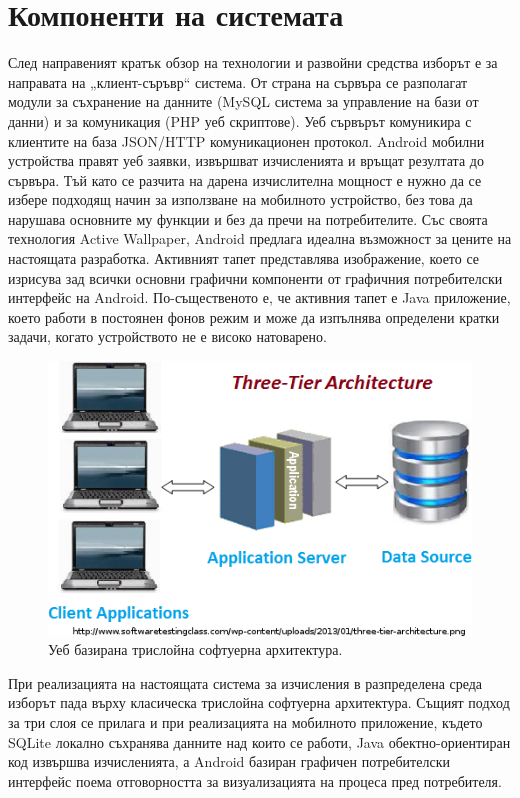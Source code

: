 \documentclass[book,14pt,oneside,openany]{memoir}
\begin{document}
\section{Компоненти на системата}

След направеният кратък обзор на технологии и развойни средства изборът е за направата на „клиент-съръвр“ система. От страна на сървъра се разполагат модули за съхранение на данните (MySQL система за управление на бази от данни) и за комуникация (PHP уеб скриптове). Уеб сървърът комуникира с клиентите на база JSON/HTTP комуникационен протокол. Android мобилни устройства правят уеб заявки, извършват изчисленията и връщат резултата до сървъра. Тъй като се разчита на дарена изчислителна мощност е нужно да се избере подходящ начин за използване на мобилното устройство, без това да нарушава основните му функции и без да пречи на потребителите. Със своята технология Active Wallpaper, Android предлага идеална възможност за цените на настоящата разработка. Активният тапет представлява изображение, което се изрисува зад всички основни графични компоненти от графичния потребителски интерфейс на Android. По-същественото е, че активния тапет е Java приложение, което работи в постоянен фонов режим и може да изпълнява определени кратки задачи, когато устройството не е високо натоварено. 

\begin{figure}[h]
  \centering
  \includegraphics[height=0.25\pdfpageheight]{./images/pic0008.png}
  \caption{Уеб базирана трислойна софтуерна архитектура.}
\label{fig:pic0008}
\end{figure}

При реализацията на настоящата система за изчисления в разпределена среда изборът пада върху класическа трислойна софтуерна архитектура. Същият подход за три слоя се прилага и при реализацията на мобилното приложение, където SQLite локално съхранява данните над които се работи, Java обектно-ориентиран код извършва изчисленията, а Android базиран графичен потребителски интерфейс поема отговорността за визуализацията на процеса пред потребителя. 
\end{document}
